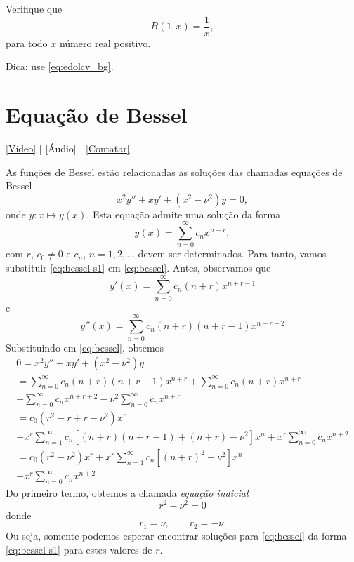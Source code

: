 \begin{exer}
  Verifique que
  \begin{equation}
    B(1,x) = \frac{1}{x},
  \end{equation}
  para todo $x$ número real positivo.
\end{exer}
\begin{resp}
  Dica: use \eqref{eq:edolcv_bg}.
\end{resp}

\section{Equação de Bessel}\label{cap_edolcv_sec_fbessel}

\begin{flushright}
  \href{https://archive.org/details/edo-bessel}{[Vídeo]} | [Áudio] | \href{https://phkonzen.github.io/notas/contato.html}{[Contatar]}
\end{flushright}

As funções de Bessel estão relacionadas as soluções das chamadas equações de Bessel
\begin{equation}\label{eq:bessel}
  x^2y'' + xy' + (x^2-\nu^2)y = 0,
\end{equation}
onde $y:x\mapsto y(x)$. Esta equação admite uma solução da forma
\begin{equation}\label{eq:bessel-s1}
  y(x) = \sum_{n=0}^\infty c_nx^{n+r},
\end{equation}
com $r$, $c_0\neq 0$ e $c_n$, $n=1,2,\ldots$ devem ser determinados. Para tanto, vamos substituir \eqref{eq:bessel-s1} em \eqref{eq:bessel}. Antes, observamos que
\begin{equation}
  y'(x) = \sum_{n=0}^\infty c_n(n+r)x^{n+r-1}
\end{equation}
e
\begin{equation}
  y''(x) = \sum_{n=0}^\infty c_n(n+r)(n+r-1)x^{n+r-2}
\end{equation}
Substituindo em \eqref{eq:bessel}, obtemos
\begin{gather}
  0 = x^2y'' + xy' + (x^2-\nu^2)y \\
  = \sum_{n=0}^\infty c_n(n+r)(n+r-1)x^{n+r} + \sum_{n=0}^\infty c_n(n+r)x^{n+r} \\
  + \sum_{n=0}^\infty c_nx^{n+r+2}- \nu^2\sum_{n=0}^\infty c_nx^{n+r}\\
  = c_0(r^2-r+r-\nu^2)x^r \\                              + x^r\sum_{n=1}^\infty c_n\left[(n+r)(n+r-1)+(n+r)-\nu^2\right]x^n+ x^r\sum_{n=0}^\infty c_nx^{n+2}\\
  = c_0(r^2-\nu^2)x^r + x^r\sum_{n=1}^\infty c_n\left[(n+r)^2-\nu^2\right]x^n \\
  + x^r\sum_{n=0}^\infty c_nx^{n+2}\label{eq:bessel-s2}
\end{gather}
Do primeiro termo, obtemos a chamada \emph{equação indicial}
\begin{equation}
  r^2 - \nu^2 = 0
\end{equation}
donde
\begin{equation}
  r_1 = \nu,\qquad r_2=-\nu.
\end{equation}
Ou seja, somente podemos esperar encontrar soluções para \eqref{eq:bessel} da forma \eqref{eq:bessel-s1} para estes valores de $r$.

